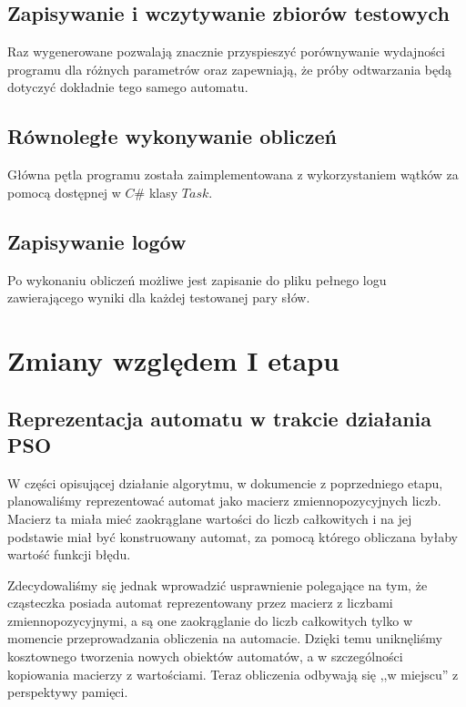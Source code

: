 \documentclass{../llncs_template/llncs}
\begin{document}
\subsection{Zapisywanie i wczytywanie zbiorów testowych}
Raz wygenerowane pozwalają znacznie przyspieszyć porównywanie wydajności programu dla różnych parametrów oraz zapewniają, że próby odtwarzania będą dotyczyć dokładnie tego samego automatu.

\subsection{Równoległe wykonywanie obliczeń}
Główna pętla programu została zaimplementowana z wykorzystaniem wątków za pomocą dostępnej w $C\#$ klasy $Task$.

\subsection{Zapisywanie logów}
Po wykonaniu obliczeń możliwe jest zapisanie do pliku pełnego logu zawierającego wyniki dla każdej testowanej pary słów.

\section{Zmiany względem I etapu}

\subsection{Reprezentacja automatu w trakcie działania PSO}

W części opisującej działanie algorytmu, w dokumencie z poprzedniego etapu, planowaliśmy reprezentować automat jako macierz zmiennopozycyjnych liczb. Macierz ta miała mieć zaokrąglane wartości do liczb całkowitych i na jej podstawie miał być konstruowany automat, za pomocą którego obliczana byłaby wartość funkcji błędu.

Zdecydowaliśmy się jednak wprowadzić usprawnienie polegające na tym, że cząsteczka posiada automat reprezentowany przez macierz z liczbami zmiennopozycyjnymi, a są one zaokrąglanie do liczb całkowitych tylko w momencie przeprowadzania obliczenia na automacie. Dzięki temu uniknęliśmy kosztownego tworzenia nowych obiektów automatów, a w szczególności kopiowania macierzy z wartościami. Teraz obliczenia odbywają się ,,w miejscu'' z perspektywy pamięci.
\end{document}
